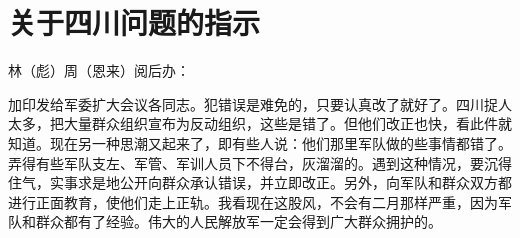 \section[关于四川问题的指示（一九六七年四月二十三日）]{关于四川问题的指示}


\noindent 林（彪）周（恩来）阅后办：

加印发给军委扩大会议各同志。犯错误是难免的，只要认真改了就好了。四川捉人太多，把大量群众组织宣布为反动组织，这些是错了。但他们改正也快，看此件就知道。现在另一种思潮又起来了，即有些人说：他们那里军队做的些事情都错了。弄得有些军队支左、军管、军训人员下不得台，灰溜溜的。遇到这种情况，要沉得住气，实事求是地公开向群众承认错误，并立即改正。另外，向军队和群众双方都进行正面教育，使他们走上正轨。我看现在这股风，不会有二月那样严重，因为军队和群众都有了经验。伟大的人民解放军一定会得到广大群众拥护的。



